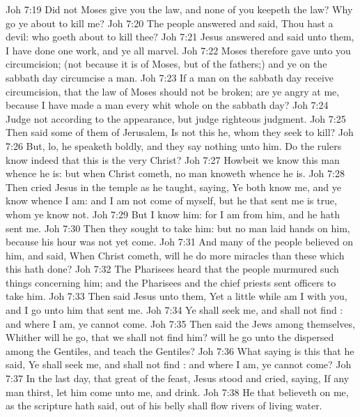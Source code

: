 \vs Joh 7:19 Did not Moses give you the law, and  none of you keepeth the law? Why go ye about to kill me?
\vs Joh 7:20 The people answered and said, Thou hast a devil: who goeth about to kill thee?
\vs Joh 7:21 Jesus answered and said unto them, I have done one work, and ye all marvel.
\vs Joh 7:22 Moses therefore gave unto you circumcision; (not because it is of Moses, but of the fathers;) and ye on the sabbath day circumcise a man.
\vs Joh 7:23 If a man on the sabbath day receive circumcision, that the law of Moses should not be broken; are ye angry at me, because I have made a man every whit whole on the sabbath day?
\vs Joh 7:24 Judge not according to the appearance, but judge righteous judgment.
\vs Joh 7:25 Then said some of them of Jerusalem, Is not this he, whom they seek to kill?
\vs Joh 7:26 But, lo, he speaketh boldly, and they say nothing unto him. Do the rulers know indeed that this is the very Christ?
\vs Joh 7:27 Howbeit we know this man whence he is: but when Christ cometh, no man knoweth whence he is.
\vs Joh 7:28 Then cried Jesus in the temple as he taught, saying, Ye both know me, and ye know whence I am: and I am not come of myself, but he that sent me is true, whom ye know not.
\vs Joh 7:29 But I know him: for I am from him, and he hath sent me.
\vs Joh 7:30 Then they sought to take him: but no man laid hands on him, because his hour was not yet come.
\vs Joh 7:31 And many of the people believed on him, and said, When Christ cometh, will he do more miracles than these which this  hath done?
\vs Joh 7:32 The Pharisees heard that the people murmured such things concerning him; and the Pharisees and the chief priests sent officers to take him.
\vs Joh 7:33 Then said Jesus unto them, Yet a little while am I with you, and  I go unto him that sent me.
\vs Joh 7:34 Ye shall seek me, and shall not find : and where I am,  ye cannot come.
\vs Joh 7:35 Then said the Jews among themselves, Whither will he go, that we shall not find him? will he go unto the dispersed among the Gentiles, and teach the Gentiles?
\vs Joh 7:36 What  saying is this that he said, Ye shall seek me, and shall not find : and where I am,  ye cannot come?
\vs Joh 7:37 In the last day, that great  of the feast, Jesus stood and cried, saying, If any man thirst, let him come unto me, and drink.
\vs Joh 7:38 He that believeth on me, as the scripture hath said, out of his belly shall flow rivers of living water.
